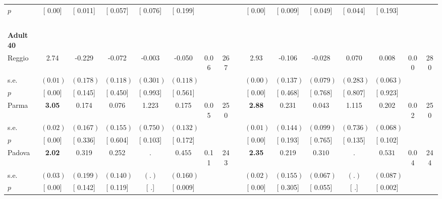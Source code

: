 \begin{longtable}{L{8em} c c c c c c c p{1em} c c c c c c c}
\quad \quad \quad \quad $ p$ & [     0.00] & [    0.011] & [    0.057] & [    0.076] & [    0.199] & & & & [     0.00] & [    0.009] & [    0.049] & [    0.044] & [    0.193] & &  \\[1em]
~\\[1em]
\quad \quad \textbf{Adult 40} & & & & & & & & & & & & & & & \\* 
\quad \quad \quad Reggio& 2.74 &    -0.229 &    -0.072 &    -0.003 &    -0.050 &      0.06 &       267 & & 2.93 &    -0.106 &    -0.028 &     0.070 &     0.008 &      0.00 &       280  \\*
\quad \quad \quad \quad s.e.& $ (     0.01)$ & $ (    0.178)$ & $ (    0.118)$ & $ (    0.301)$ & $ (    0.118)$ & & & & $ (     0.00)$ & $ (    0.137)$ & $ (    0.079)$ & $ (    0.283)$ & $ (    0.063)$ & &  \\*
\quad \quad \quad \quad $ p$ & [     0.00] & [    0.145] & [    0.450] & [    0.993] & [    0.561] & & & & [     0.00] & [    0.468] & [    0.768] & [    0.807] & [    0.923] & &  \\[1em]
\quad \quad \quad Parma& \textbf{     3.05} &     0.174 &     0.076 &     1.223 &     0.175 &      0.05 &       250 & & \textbf{     2.88} &     0.231 &     0.043 &     1.115 &     0.202 &      0.02 &       250  \\*
\quad \quad \quad \quad s.e.& $ (     0.02)$ & $ (    0.167)$ & $ (    0.155)$ & $ (    0.750)$ & $ (    0.132)$ & & & & $ (     0.01)$ & $ (    0.144)$ & $ (    0.099)$ & $ (    0.736)$ & $ (    0.068)$ & &  \\*
\quad \quad \quad \quad $ p$ & [     0.00] & [    0.336] & [    0.604] & [    0.103] & [    0.172] & & & & [     0.00] & [    0.193] & [    0.765] & [    0.135] & [    0.102] & &  \\[1em]
\quad \quad \quad Padova& \textbf{     2.02} &     0.319 &     0.252 &         . & $ \mathbf{    0.455}$ &      0.11 &       243 & & \textbf{     2.35} &     0.219 & $ \mathbf{    0.310}$ &         . & $ \mathbf{    0.531}$ &      0.04 &       244  \\*
\quad \quad \quad \quad s.e.& $ (     0.03)$ & $ (    0.199)$ & $ (    0.140)$ & $ (        .)$ & $ (    0.160)$ & & & & $ (     0.02)$ & $ (    0.155)$ & $ (    0.067)$ & $ (        .)$ & $ (    0.087)$ & &  \\*
\quad \quad \quad \quad $ p$ & [     0.00] & [    0.142] & [    0.119] & [        .] & [    0.009] & & & & [     0.00] & [    0.305] & [    0.055] & [        .] & [    0.002] & &  \\[1em]

\end{longtable}
